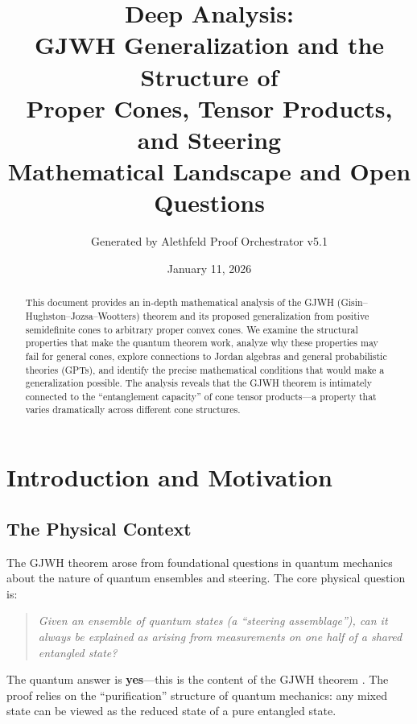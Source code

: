 \documentclass[11pt,a4paper]{article}
\title{Deep Analysis:\\
GJWH Generalization and the Structure of\\
Proper Cones, Tensor Products, and Steering\\[0.5em]
\large Mathematical Landscape and Open Questions}
\author{Generated by Alethfeld Proof Orchestrator v5.1}
\date{January 11, 2026}
\theoremstyle{definition}
\begin{document}
\maketitle

\begin{abstract}
This document provides an in-depth mathematical analysis of the GJWH (Gisin--Hughston--Jozsa--Wootters) theorem and its proposed generalization from positive semidefinite cones to arbitrary proper convex cones. We examine the structural properties that make the quantum theorem work, analyze why these properties may fail for general cones, explore connections to Jordan algebras and general probabilistic theories (GPTs), and identify the precise mathematical conditions that would make a generalization possible. The analysis reveals that the GJWH theorem is intimately connected to the ``entanglement capacity'' of cone tensor products---a property that varies dramatically across different cone structures.
\end{abstract}

\tableofcontents
\newpage

\section{Introduction and Motivation}

\subsection{The Physical Context}

The GJWH theorem arose from foundational questions in quantum mechanics about the nature of quantum ensembles and steering. The core physical question is:

\begin{quote}
\emph{Given an ensemble of quantum states (a ``steering assemblage''), can it always be explained as arising from measurements on one half of a shared entangled state?}
\end{quote}

The quantum answer is \textbf{yes}---this is the content of the GJWH theorem \cite{gisin1989stochastic,hughston1993complete}. The proof relies on the ``purification'' structure of quantum mechanics: any mixed state can be viewed as the reduced state of a pure entangled state.
\end{document}
